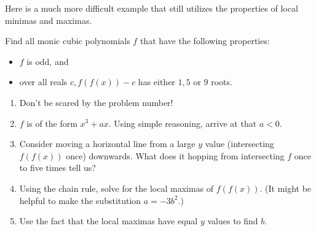 \documentclass[mast]{lucky}
\begin{document}
Here is a much more difficult example that still utilizes the properties of local minimas and maximas.
\begin{exam}
Find all monic cubic polynomials $f$ that have the following properties:
\begin{itemize}
\item $f$ is odd, and
\item over all reals $c, f(f(x))-c$ has either $1, 5$ or $9$ roots.
\end{itemize}
\end{exam}
\begin{walk}
\begin{enumerate}
\item Don't be scared by the problem number!
\item $f$ is of the form $x^3+ax$. Using simple reasoning, arrive at that $a<0$.
\item Consider moving a horizontal line from a large $y$ value (intersecting $f(f(x))$ once) downwards. What does it hopping from intersecting $f$ once to five times tell us?
\item Using the chain rule, solve for the local maximas of $f(f(x))$. (It might be helpful to make the substitution $a=-3b^2$.)
\item Use the fact that the local maximas have equal $y$ values to find $b$.
\end{enumerate}
\end{walk}
\end{document}
